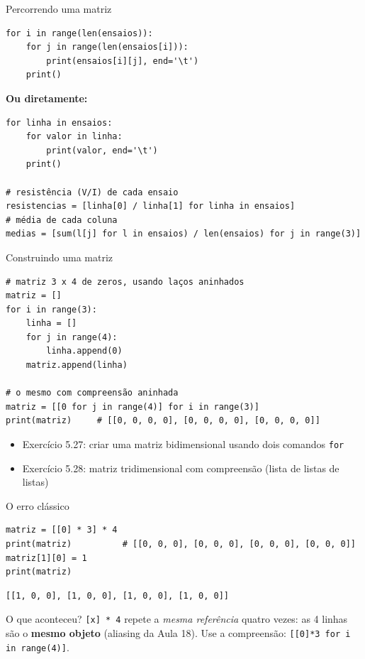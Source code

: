 \documentclass[aspectratio=169,10pt,t]{beamer}
\begin{document}
\begin{frame}[fragile]{Percorrendo uma matriz}
\begin{lstlisting}
for i in range(len(ensaios)):
    for j in range(len(ensaios[i])):
        print(ensaios[i][j], end='\t')
    print()
\end{lstlisting}
  \textbf{Ou diretamente:}
\begin{lstlisting}
for linha in ensaios:
    for valor in linha:
        print(valor, end='\t')
    print()

# resistência (V/I) de cada ensaio
resistencias = [linha[0] / linha[1] for linha in ensaios]
# média de cada coluna
medias = [sum(l[j] for l in ensaios) / len(ensaios) for j in range(3)]
\end{lstlisting}
\end{frame}

\begin{frame}[fragile]{Construindo uma matriz}
\begin{lstlisting}
# matriz 3 x 4 de zeros, usando laços aninhados
matriz = []
for i in range(3):
    linha = []
    for j in range(4):
        linha.append(0)
    matriz.append(linha)

# o mesmo com compreensão aninhada
matriz = [[0 for j in range(4)] for i in range(3)]
print(matriz)     # [[0, 0, 0, 0], [0, 0, 0, 0], [0, 0, 0, 0]]
\end{lstlisting}
  \begin{itemize}
    \item Exercício 5.27: criar uma matriz bidimensional usando dois comandos \texttt{for}
    \item Exercício 5.28: matriz \alert{tridimensional} com compreensão (lista de listas de listas)
  \end{itemize}
\end{frame}

\begin{frame}[fragile]{O erro clássico}
\begin{lstlisting}
matriz = [[0] * 3] * 4
print(matriz)          # [[0, 0, 0], [0, 0, 0], [0, 0, 0], [0, 0, 0]]
matriz[1][0] = 1
print(matriz)
\end{lstlisting}
\begin{lstlisting}[style=saida]
[[1, 0, 0], [1, 0, 0], [1, 0, 0], [1, 0, 0]]
\end{lstlisting}
  \begin{alertblock}{O que aconteceu?}
    \texttt{[x] * 4} repete a \emph{mesma referência} quatro vezes: as 4 linhas são o \textbf{mesmo objeto} (aliasing da Aula 18). Use a compreensão: \texttt{[[0]*3 for i in range(4)]}.
  \end{alertblock}
\end{frame}
\end{document}
